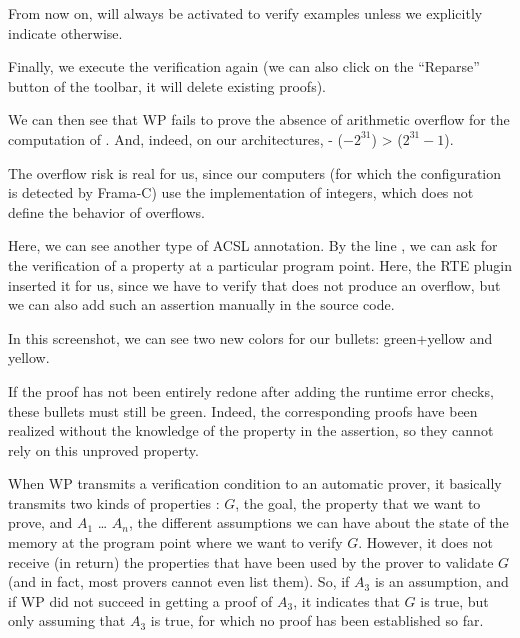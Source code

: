 \begin{Information}
  From now on,  will always be activated to verify examples
  unless we explicitly indicate otherwise.
\end{Information}


Finally, we execute the verification again (we can also click on the
``Reparse'' button of the toolbar, it will delete existing proofs).

We can then see that WP fails to prove the absence of arithmetic
overflow for the computation of . And, indeed, on our
architectures, - ($-2^{31}$) >  ($2^{31}-1$).





\begin{Information}
The overflow risk
is real for us, since our computers (for which the
configuration is detected by Frama-C) use the
implementation of integers, which does not define
the behavior of overflows.
\end{Information}


Here, we can see another type of ACSL annotation. By the line
, we can ask for the verification of a
property at a particular program point. Here, the RTE plugin inserted it for
us, since
we have to verify that  does not produce an overflow, but
we can also add such an assertion manually in the source code.



In this screenshot, we can see two new colors for our bullets:
green+yellow and yellow.



If the proof has not been entirely redone after adding the runtime error
checks, these bullets must still be green. Indeed, the corresponding
proofs have been realized without the knowledge of the property in the
assertion, so they cannot rely on this unproved property.



When WP transmits a verification condition to an automatic prover, it
basically transmits two kinds of properties : $G$, the goal, the
property that we want to prove, and $A_1$ \ldots{} $A_n$, the
different assumptions we can have about the state of the memory at the
program point where we want to verify $G$. However, it does not
receive (in return) the properties that have been used by the prover to
validate $G$ (and in fact, most provers cannot even list them). So, if
$A_3$ is an assumption, and if WP did not succeed in getting a proof of $A_3$,
it indicates that $G$ is true, but only assuming that $A_3$ is true, for which
no proof has been established so far.



